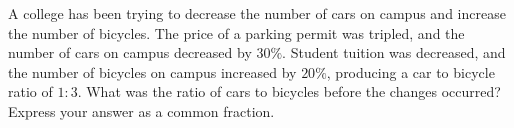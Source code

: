A college has been trying to decrease the number of cars on campus and increase the number of bicycles. The price of a parking permit was tripled, and the number of cars on campus decreased by $30\%$. Student tuition was decreased, and the number of bicycles on campus increased by $20\%$, producing a car to bicycle ratio of $1:3$. What was the ratio of cars to bicycles before the changes occurred? Express your answer as a common fraction.
